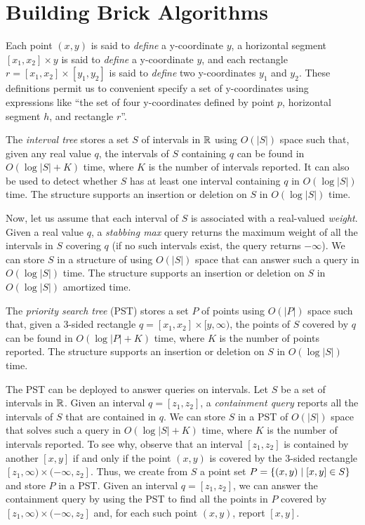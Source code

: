 \documentclass[sigconf]{acmart}
\def\vgap{\vspace{0mm}}
\def\extraspacing{\vspace{1.5mm} \noindent}
\begin{document}
{{{\section{Building Brick Algorithms} \label{app:bricks}

\extraspacing {\bf Terminology.} Each point $(x, y)$ is said to {\em define} a y-coordinate $y$, a horizontal segment $[x_1, x_2] \times y$ is said to {\em define} a y-coordinate $y$, and each rectangle $r = [x_1, x_2] \times [y_1, y_2]$ is said to {\em define} two y-coordinates $y_1$ and $y_2$. These definitions permit us to convenient specify a set of y-coordinates using expressions like ``the set of four y-coordinates defined by point $p$, horizontal segment $h$, and rectangle $r$''.

\extraspacing {\bf Fundamental Data Structures.} The {\em interval tree} \cite{bcko08} stores a set $S$ of intervals in $\mathbb{R}$ using $O(|S|)$ space such that, given any real value $q$, the intervals of $S$ containing $q$ can be found in $O(\log |S| + K)$ time, where $K$ is the number of intervals reported. It can also be used to detect whether $S$ has at least one interval containing $q$ in $O(\log |S|)$ time. The structure supports an insertion or deletion on $S$ in $O(\log |S|)$ time.

\vgap

Now, let us assume that each interval of $S$ is associated with a real-valued {\em weight}. Given a real value $q$, a {\em stabbing max} query returns the maximum weight of all the intervals in $S$ covering $q$ (if no such intervals exist, the query returns $-\infty$). We can store $S$ in a structure of \cite{aak+12} using $O(|S|)$ space that can answer such a query in $O(\log |S|)$ time. The structure supports an insertion or deletion on $S$ in $O(\log |S|)$ amortized time.

\vgap

The {\em priority search tree} (PST) \cite{m85} stores a set $P$ of points using $O(|P|)$ space such that, given a 3-sided rectangle $q = [x_1, x_2] \times [y, \infty)$, the points of $S$ covered by $q$ can be found in $O(\log |P| + K)$ time, where $K$ is the number of points reported. The structure supports an insertion or deletion on $S$ in $O(\log |S|)$ time.

\vgap

The PST can be deployed to answer queries on intervals. Let $S$ be a set of intervals in $\mathbb{R}$. Given an interval $q = [z_1, z_2]$, a {\em containment query} reports all the intervals of $S$ that are contained in $q$. We can store $S$ in a PST of $O(|S|)$ space that solves such a query in $O(\log |S| + K)$ time, where $K$ is the number of intervals reported. To see why, observe that an interval $[z_1, z_2]$ is contained by another $[x, y]$ if and only if the point $(x, y)$ is covered by the 3-sided rectangle $[z_1, \infty) \times (-\infty, z_2]$. Thus, we create from $S$ a point set $P = \{(x, y) \mid [x, y] \in S\}$ and store $P$ in a PST. Given an interval $q = [z_1, z_2]$, we can answer the containment query by using the PST to find all the points in $P$ covered by $[z_1, \infty) \times (-\infty, z_2]$ and, for each such point $(x, y)$, report $[x, y]$.

}}}
\end{document}
